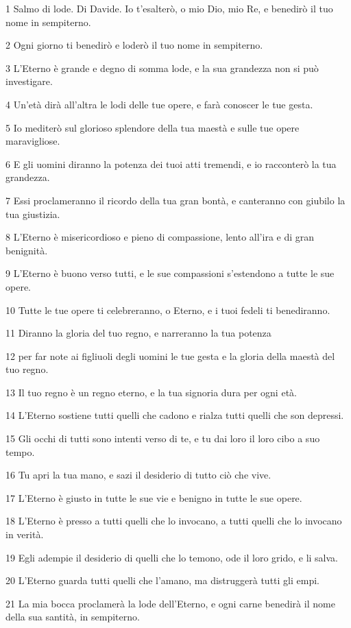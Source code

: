 \par 1 Salmo di lode. Di Davide. Io t'esalterò, o mio Dio, mio Re, e benedirò il tuo nome in sempiterno.
\par 2 Ogni giorno ti benedirò e loderò il tuo nome in sempiterno.
\par 3 L'Eterno è grande e degno di somma lode, e la sua grandezza non si può investigare.
\par 4 Un'età dirà all'altra le lodi delle tue opere, e farà conoscer le tue gesta.
\par 5 Io mediterò sul glorioso splendore della tua maestà e sulle tue opere maravigliose.
\par 6 E gli uomini diranno la potenza dei tuoi atti tremendi, e io racconterò la tua grandezza.
\par 7 Essi proclameranno il ricordo della tua gran bontà, e canteranno con giubilo la tua giustizia.
\par 8 L'Eterno è misericordioso e pieno di compassione, lento all'ira e di gran benignità.
\par 9 L'Eterno è buono verso tutti, e le sue compassioni s'estendono a tutte le sue opere.
\par 10 Tutte le tue opere ti celebreranno, o Eterno, e i tuoi fedeli ti benediranno.
\par 11 Diranno la gloria del tuo regno, e narreranno la tua potenza
\par 12 per far note ai figliuoli degli uomini le tue gesta e la gloria della maestà del tuo regno.
\par 13 Il tuo regno è un regno eterno, e la tua signoria dura per ogni età.
\par 14 L'Eterno sostiene tutti quelli che cadono e rialza tutti quelli che son depressi.
\par 15 Gli occhi di tutti sono intenti verso di te, e tu dai loro il loro cibo a suo tempo.
\par 16 Tu apri la tua mano, e sazi il desiderio di tutto ciò che vive.
\par 17 L'Eterno è giusto in tutte le sue vie e benigno in tutte le sue opere.
\par 18 L'Eterno è presso a tutti quelli che lo invocano, a tutti quelli che lo invocano in verità.
\par 19 Egli adempie il desiderio di quelli che lo temono, ode il loro grido, e li salva.
\par 20 L'Eterno guarda tutti quelli che l'amano, ma distruggerà tutti gli empi.
\par 21 La mia bocca proclamerà la lode dell'Eterno, e ogni carne benedirà il nome della sua santità, in sempiterno.

